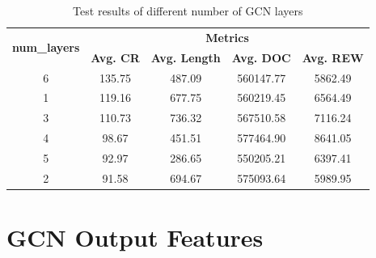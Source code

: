   \begin{table}[H]
	\centering
	\caption{Test results of different number of \ac{GCN} layers}
	\begin{tabular}{ccccc}
		\toprule
		\multirow{2}{*}{\textbf{num\_layers}} & \multicolumn{4}{c}{\textbf{Metrics}} \\ 
		\cmidrule(lr){2-5}
		&  \textbf{Avg. CR} & \textbf{Avg. Length} & \textbf{Avg. DOC} & \textbf{Avg. REW} \\ 
		\midrule
		
		6 & 135.75 & 487.09 & 560147.77 & 5862.49 \\
		1 & 119.16 & 677.75 & 560219.45 & 6564.49 \\
		3 & 110.73 & 736.32 & 567510.58 & 7116.24 \\
		4 & 98.67 & 451.51 & 577464.90 & 8641.05 \\
		5 & 92.97 & 286.65 & 550205.21 & 6397.41 \\
		2 & 91.58 & 694.67 & 575093.64 & 5989.95 \\
		\bottomrule
	\end{tabular}
	\label{tab:test-gcn-layers2}
\end{table}

\section{\ac{GCN} Output Features} 


